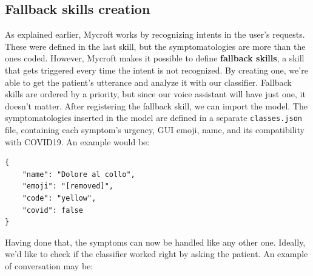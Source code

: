 \documentclass[conference]{IEEEtran}
\begin{document}
\subsection{Fallback skills creation}
As explained earlier, Mycroft works by recognizing intents in the user's requests. These were defined in the last skill, but the symptomatologies are more than the ones coded. However, Mycroft makes it possible to define \textbf{fallback skills}, a skill that gets triggered every time the intent is not recognized. By creating one, we're able to get the patient's utterance and analyze it with our classifier. Fallback skills are ordered by a priority, but since our voice assistant will have just one, it doesn't matter. After registering the fallback skill, we can import the model. The symptomatologies inserted in the model are defined in a separate \texttt{classes.json} file, containing each symptom's urgency, GUI emoji, name, and its compatibility with COVID19. An example would be:
\begin{verbatim}
{
    "name": "Dolore al collo",
    "emoji": "[removed]",
    "code": "yellow",
    "covid": false
}
\end{verbatim}
Having done that, the symptoms can now be handled like any other one. Ideally, we'd like to check if the classifier worked right by asking the patient.
An example of conversation may be:
\end{document}
